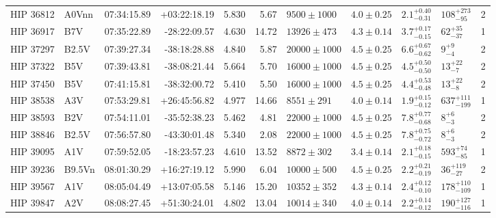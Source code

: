 \begin{landscape}
\begin{scriptsize}
\begin{longtable}{|l|lrrrrlllll|}
   HIP 36812 &    A0Vnn &    07:34:15.89 &   +03:22:18.19 &   5.830 &      5.67 &   $9500 \pm 1000$ &  $4.0 \pm 0.25$ &  $2.1^{+0.40}_{-0.31}$ &    $108^{+273}_{-95}$ &       2 \\
   HIP 36917 &      B7V &    07:35:22.89 &   -28:22:09.57 &   4.630 &     14.72 &   $13926 \pm 473$ &  $4.3 \pm 0.14$ &  $3.7^{+0.17}_{-0.15}$ &      $62^{+35}_{-37}$ &       1 \\
   HIP 37297 &    B2.5V &    07:39:27.34 &   -38:18:28.88 &   4.840 &      5.87 &  $20000 \pm 1000$ &  $4.5 \pm 0.25$ &  $6.6^{+0.67}_{-0.62}$ &         $9^{+9}_{-4}$ &       2 \\
   HIP 37322 &      B5V &    07:39:43.81 &   -38:08:21.44 &   5.664 &      5.70 &  $16000 \pm 1000$ &  $4.5 \pm 0.25$ &  $4.5^{+0.50}_{-0.50}$ &       $13^{+22}_{-7}$ &       2 \\
   HIP 37450 &      B5V &    07:41:15.81 &   -38:32:00.72 &   5.410 &      5.50 &  $16000 \pm 1000$ &  $4.5 \pm 0.25$ &  $4.4^{+0.53}_{-0.48}$ &       $13^{+22}_{-8}$ &       2 \\
   HIP 38538 &      A3V &    07:53:29.81 &   +26:45:56.82 &   4.977 &     14.66 &    $8551 \pm 291$ &  $4.0 \pm 0.14$ &  $1.9^{+0.15}_{-0.12}$ &   $637^{+111}_{-199}$ &       1 \\
   HIP 38593 &      B2V &    07:54:11.01 &   -35:52:38.23 &   5.462 &      4.81 &  $22000 \pm 1000$ &  $4.5 \pm 0.25$ &  $7.8^{+0.77}_{-0.68}$ &         $8^{+6}_{-3}$ &       2 \\
   HIP 38846 &    B2.5V &    07:56:57.80 &   -43:30:01.48 &   5.340 &      2.08 &  $22000 \pm 1000$ &  $4.5 \pm 0.25$ &  $7.8^{+0.75}_{-0.72}$ &         $8^{+6}_{-3}$ &       2 \\
   HIP 39095 &      A1V &    07:59:52.05 &   -18:23:57.23 &   4.610 &     13.52 &    $8872 \pm 302$ &  $3.4 \pm 0.14$ &  $2.1^{+0.18}_{-0.15}$ &     $593^{+74}_{-85}$ &       1 \\
   HIP 39236 &   B9.5Vn &    08:01:30.29 &   +16:27:19.12 &   5.990 &      6.04 &   $10000 \pm 500$ &  $4.5 \pm 0.25$ &  $2.2^{+0.21}_{-0.19}$ &     $36^{+119}_{-27}$ &       2 \\
   HIP 39567 &      A1V &    08:05:04.49 &   +13:07:05.58 &   5.146 &     15.20 &   $10352 \pm 352$ &  $4.3 \pm 0.14$ &  $2.4^{+0.12}_{-0.10}$ &   $178^{+110}_{-109}$ &       1 \\
   HIP 39847 &      A2V &    08:08:27.45 &   +51:30:24.01 &   4.802 &     13.04 &   $10014 \pm 340$ &  $4.0 \pm 0.14$ &  $2.2^{+0.14}_{-0.12}$ &   $190^{+127}_{-116}$ &       1 \\

\end{longtable}
\end{scriptsize}
\end{landscape}

